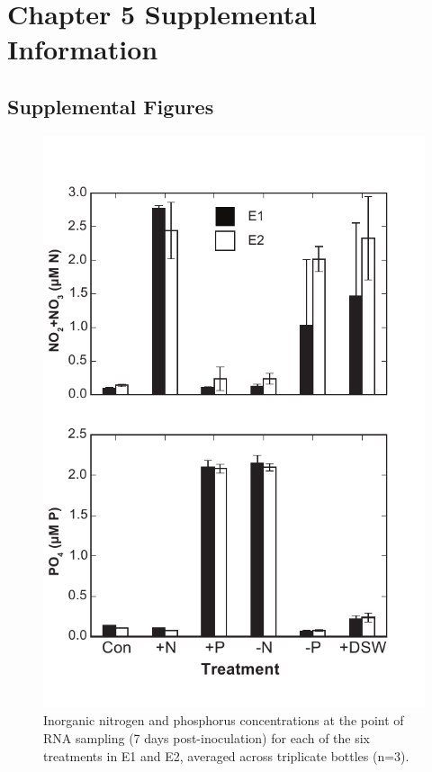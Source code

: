 \chapter{Chapter 5 Supplemental Information}
\clearpage
\section{Supplemental Figures}


\begin{figure}[h!]
  \centering
    \includegraphics[width=.6\textwidth]{Images/C6_FigureS1_nutrients_v1.pdf}
    \caption{Inorganic nitrogen and phosphorus concentrations at the point of RNA sampling (7 days post-inoculation) for each of the six treatments in E1 and E2, averaged across triplicate bottles (n=3).}
    \label{fig:a5f1}
\end{figure}



